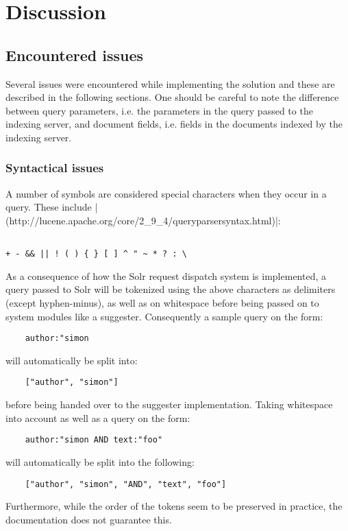 \section{Discussion}\label{discussion}

\subsection{Encountered issues}

Several issues were encountered while implementing the solution and these are described in the following sections. One should be careful to note the difference between query parameters, i.e. the parameters in the query passed to the indexing server, and document fields, i.e. fields in the documents indexed by the indexing server.

\subsubsection{Syntactical issues}

A number of symbols are considered special characters when they occur in a query. These include |(http://lucene.apache.org/core/2_9_4/queryparsersyntax.html)|:
\begin{verbatim}

+ - && || ! ( ) { } [ ] ^ " ~ * ? : \
\end{verbatim}

As a consequence of how the Solr request dispatch system is implemented, a query passed to Solr will be tokenized using the above characters as delimiters (except hyphen-minus), as well as on whitespace before being passed on to system modules like a suggester.
Consequently a sample query on the form:

\begin{verbatim}
    author:"simon
\end{verbatim}

will automatically be split into:
\begin{verbatim}
    ["author", "simon"]
\end{verbatim}
before being handed over to the suggester implementation.
Taking whitespace into account as well as a query on the form:

\begin{verbatim}
    author:"simon AND text:"foo"
\end{verbatim}
will automatically be split into the following:
\begin{verbatim}
    ["author", "simon", "AND", "text", "foo"]
\end{verbatim}
Furthermore, while the order of the tokens seem to be preserved in practice, the documentation does not guarantee this.

